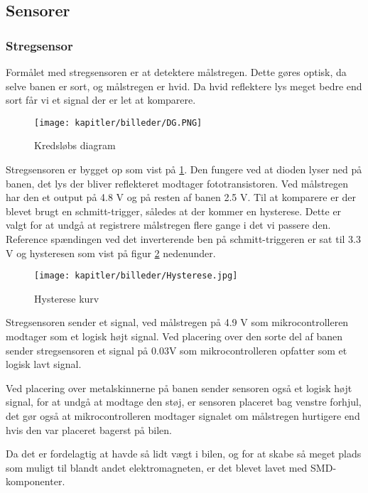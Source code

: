 
\subsection{Sensorer}


\subsubsection{Stregsensor}
Formålet med stregsensoren er at detektere målstregen. Dette gøres optisk, da selve banen er sort, og målstregen er hvid. Da hvid reflektere lys meget bedre end sort får vi et signal der er let at komparere.
\begin{figure}[ht]
	\centering
	\texttt{[image: kapitler/billeder/DG.PNG]}
	\caption{Kredsløbs diagram}
	\label{fig:DG}
\end{figure}
Stregsensoren er bygget op som vist på \ref{fig:DG}. Den fungere ved at dioden lyser ned på banen, det lys der bliver reflekteret modtager fototransistoren. Ved målstregen har den et output på 4.8 V og på resten af banen 2.5 V. Til at komparere er der blevet brugt en schmitt-trigger, således at der kommer en hysterese. Dette er valgt for at undgå at registrere målstregen flere gange i det vi passere den. Reference spændingen ved det inverterende ben på schmitt-triggeren er sat til 3.3 V og hysteresen som vist på figur \ref{fig:hys} nedenunder.

\begin{figure}[ht]
	\centering
	\texttt{[image: kapitler/billeder/Hysterese.jpg]}
	\caption{Hysterese kurv}
	\label{fig:hys}
\end{figure}

Stregsensoren sender et signal, ved målstregen på 4.9 V som  mikrocontrolleren modtager som et logisk højt signal. Ved placering over den sorte del af banen sender stregsensoren et signal på 0.03V som mikrocontrolleren opfatter som et logisk lavt signal.

Ved placering over metalskinnerne på banen sender sensoren også et logisk højt signal, for at undgå at modtage den støj, er sensoren placeret bag venstre forhjul, det gør også at mikrocontrolleren modtager signalet om målstregen hurtigere end hvis den var placeret bagerst på bilen.

Da det er fordelagtig at havde så lidt vægt i bilen, og for at skabe så meget plads som muligt til blandt andet elektromagneten, er det blevet lavet med SMD-komponenter.


